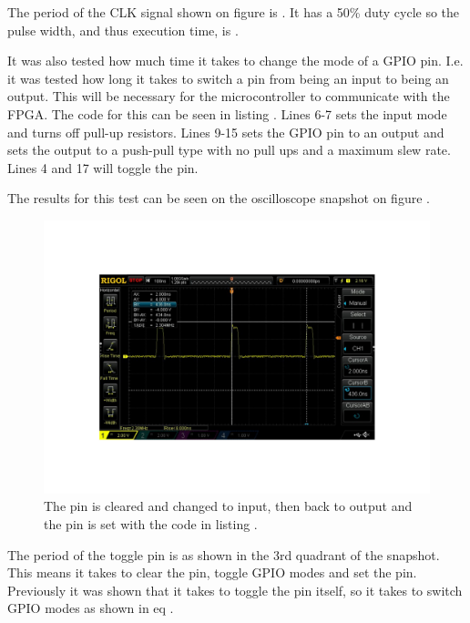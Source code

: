 The period of the CLK signal shown on figure  is . It has a 50\% duty cycle so the pulse width, and thus execution time, is .

It was also tested how much time it takes to change the mode of a GPIO pin. I.e. it was tested how long it takes to switch a pin from being an input to being an output. This will be necessary for the microcontroller to communicate with the FPGA. The code for this can be seen in listing . Lines 6-7 sets the input mode and turns off pull-up resistors. Lines 9-15 sets the GPIO pin to an output and sets the output to a push-pull type with no pull ups and a maximum slew rate. Lines 4 and 17 will toggle the pin.



The results for this test can be seen on the oscilloscope snapshot on figure .
\begin{figure}[H]
    \centering
    \includegraphics[clip, trim=0 100 0 100, width=1\textwidth]{Appendix/Figures/IOOutputToInputSpeed.pdf}
    \caption{The pin is cleared and changed to input, then back to output and the pin is set with the code in listing .}
    \label{fig:App_A_OutputInputSpeed}
\end{figure}

The period of the toggle pin is  as shown in the 3rd quadrant of the snapshot. This means it takes  to clear the pin, toggle GPIO modes and set the pin. Previously it was shown that it takes  to toggle the pin itself, so it takes  to switch GPIO modes as shown in eq .

